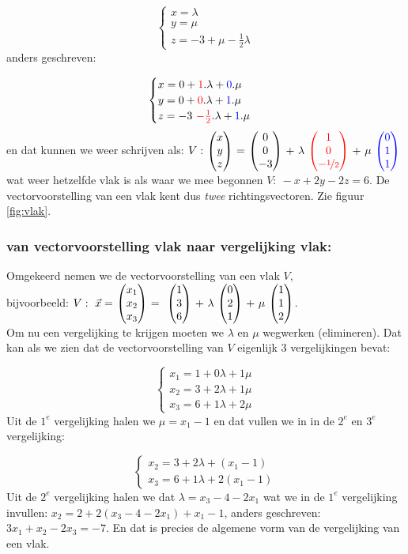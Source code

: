 \[\begin{cases}
x =  \lambda\\
y =  \mu\\
z = -3 + \mu -   \frac{1}{2} \lambda 
\end{cases}
\] 
anders geschreven:

\[\begin{cases}
x =  0 + {\color{red}1}.\lambda +  {\color{blue}0}.\mu\\
y =  0 +  {\color{red}0}.\lambda  + {\color{blue}1}. \mu\\
z = -3 \  {\color{red}- \frac{1}{2}} .\lambda + {\color{blue}1}.\mu 
\end{cases}
\] 
en dat kunnen we weer schrijven als:
$ V: \ \vecdrie{x}{y}{z} \ = \ \vecdrie{0}{0}{-3} \ + \ \lambda \  \vecdrie[red]{1}{0}{-\nicefrac{1} {2}}   \ + \ \mu \ \vecdrie[blue]{0}{1}{1} $ wat weer hetzelfde vlak is als waar we mee begonnen $ V: \ -x + 2y -2z = 6 $.
De vectorvoorstelling van een vlak kent dus \textit{twee}  richtingsvectoren. 
Zie  figuur  \ref{fig:vlak}.

\subsubsection{van vectorvoorstelling vlak naar vergelijking vlak:}
Omgekeerd nemen we de vectorvoorstelling van een vlak $ V $,\\ 
bijvoorbeeld:
$ V: \  \vec{x} =\  \vecdriesnel{x} \ = \  \ \vecdrie{1}{3}{6} \ + \ \lambda \ \vecdrie{0}{2}{1} \ + \ \mu \ \vecdrie{1}{1}{2} $.\\
Om nu een vergelijking te krijgen moeten we $ \lambda $  en $ \mu $ wegwerken (elimineren). Dat kan als we zien dat de vectorvoorstelling van $ V $ eigenlijk 3 vergelijkingen bevat:

\[\begin{cases}
x_1 =  1 + 0\lambda + 1\mu\\
x_2 =  3 + 2\lambda  + 1\mu\\
x_3 = 6 + 1 \lambda + 2\mu  
\end{cases}
\] 
Uit de $ 1^{e}$ vergelijking halen we $ \mu = x_1 -1 $ en dat vullen we in in de $ 2^{e}$ en $ 3^{e}$ vergelijking:

\[\begin{cases}
x_2 =  3 + 2\lambda  + ( x_1 -1)\\
x_3 = 6 + 1 \lambda + 2( x_1 -1)
\end{cases}
\] 
Uit de $ 2^{e}$ vergelijking halen we dat $ \lambda = x_3 - 4 - 2x_1 $ wat we in de $ 1^{e}$ vergelijking invullen:
$ x_2 = 2 + 2(x_3 -4 -2x_1) + x_1 - 1$, anders geschreven: $ 3x_1 +x_2 - 2x_3 = -7
$. En dat is precies de algemene vorm van de vergelijking van een vlak.


